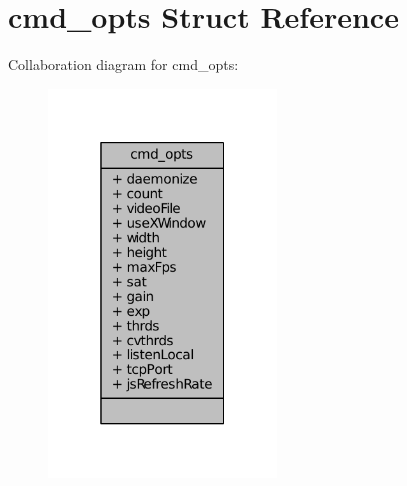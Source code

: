 \hypertarget{structcmd__opts}{\section{cmd\+\_\+opts Struct Reference}
\label{structcmd__opts}
}


Collaboration diagram for cmd\+\_\+opts\+:\nopagebreak
\begin{figure}[H]
\begin{center}
\leavevmode
\includegraphics[width=172pt]{structcmd__opts__coll__graph}
\end{center}
\end{figure}
